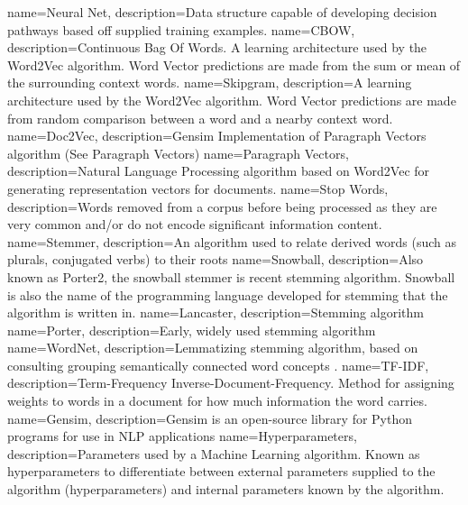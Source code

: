 {
name={Neural Net},
description={Data structure capable of developing decision pathways based off supplied training examples.} 
}
{
name={CBOW},
description={Continuous Bag Of Words. A learning architecture used by the Word2Vec algorithm. Word Vector predictions are made from the sum or mean of the surrounding context words.} 
}
{
name={Skipgram},
description={A learning architecture used by the Word2Vec algorithm. Word Vector predictions are made from random comparison between a word and a nearby context word.} 
}
{
name={Doc2Vec},
description={Gensim Implementation of Paragraph Vectors algorithm (See Paragraph Vectors)} 
}
{
name={Paragraph Vectors},
description={Natural Language Processing algorithm based on Word2Vec for generating representation vectors for documents. } 
}
{
name={Stop Words},
description={Words removed from a corpus before being processed as they are very common and/or do not encode significant information content.} 
}
{
name={Stemmer},
description={An algorithm used to relate derived words (such as plurals, conjugated verbs) to their roots} 
}
{
name={Snowball},
description={Also known as Porter2, the snowball stemmer is recent stemming algorithm\cite{snowball}. Snowball is also the name of the programming language developed for stemming that the algorithm is written in.} 
}
{
name={Lancaster},
description={Stemming algorithm \cite{lancaster}} 
}
{
name={Porter},
description={Early, widely used stemming algorithm \cite{porter}} 
}
{
name={WordNet},
description={Lemmatizing stemming algorithm, based on consulting grouping semantically connected word concepts \cite{wordnet1} \cite{wordnet2} \cite{wordnet3}.} 
}
{
name={TF-IDF},
description={Term-Frequency Inverse-Document-Frequency. Method for assigning weights to words in a document for how much information the word carries.} 
}
{
name={Gensim},
description={Gensim is an open-source library for Python programs for use in NLP applications} 
}
{
name={Hyperparameters},
description={Parameters used by a Machine Learning algorithm. Known as hyperparameters to differentiate between external parameters supplied to the algorithm (hyperparameters) and internal parameters known by the algorithm.} 
}
